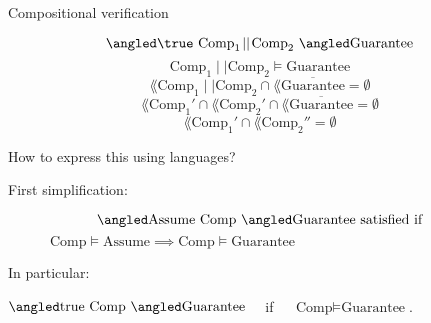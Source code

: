 \documentclass[../talk.tex]{subfiles}
\begin{document}
\begin{frame}{Compositional verification}
    \begin{overlayarea}{\slidewidth}{\slideheight}
        {%
            \[
                \relyguarantee{\true}{\text{Comp}_1 \!\mid\mid\! \text{Comp}_2}
                {\text{Guarantee}}
            \]
        }%
        {%
            \[
                \text{Comp}_1 \!\mid\mid\! \text{Comp}_2
                \models
                \text{Guarantee}
            \]
        }%
        {%
            \[
                \lang{ \text{Comp}_1 \!\mid\mid\! \text{Comp}_2 }
                \cap
                \lang{ \overline{\text{Guarantee}}}
                = \emptyset
            \]
        }%
        {%
            \[
                \lang{ \text{Comp}_1'} \cap \lang{ \text{Comp}_2' }
                \cap
                \lang{ \overline{\text{Guarantee}} }
                = \emptyset
            \]
        }%
        {%
            \[
                \lang{ \text{Comp}_1'} \cap \lang{ \text{Comp}_2'' }
                = \emptyset
            \]
        }%

        \vspace*{1em}

        How to express this using \alert{languages}?
        {%
            \vspace*{1em}

            First simplification:

                \[
                    \relyguarantee{\text{Assume}}{\text{Comp}}{\text{Guarantee}}
                    \text{ satisfied if}
                \]
                \(
                    \qquad \quad  \text{Comp} \models \text{Assume}
                    \implies
                    \text{Comp} \models \text{Guarantee}
                \)

                \vspace*{1em}

                In particular:

                \vspace*{1em}

                $\relyguarantee{\text{true}}{\text{Comp}}{\text{Guarantee}} \quad$ if
                $\quad \text{Comp} \models \text{Guarantee}$.

        }
        {%
            \vspace*{1em}

}
\end{overlayarea}
\end{frame}
\end{document}
